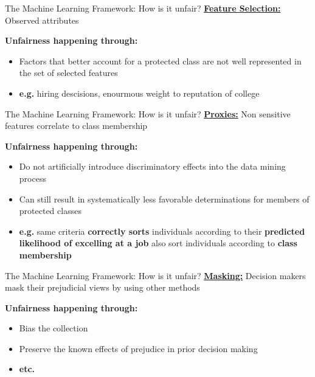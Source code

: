 \begin{frame}{The Machine Learning Framework: How is it unfair? \cite{Barocas.2016}}
    \underline{\textbf{Feature Selection:}} Observed attributes \newline 
    
    \begin{block}{\textbf{Unfairness happening through:}}
    \begin{itemize}
        \item Factors that better account for a protected class are not well represented in the set of selected features 
        \item \textbf{e.g.} hiring descisions, enourmous weight to reputation of college
    \end{itemize}
        \end{block}
\end{frame}

\begin{frame}{The Machine Learning Framework: How is it unfair? \cite{Barocas.2016}}
    \underline{\textbf{Proxies:}} Non sensitive features correlate to class membership \newline

    \begin{block}{\textbf{Unfairness happening through:}}
    \begin{itemize}
        \item Do not artificially introduce discriminatory effects into the data mining process
        \item Can still result in systematically less favorable determinations for members of protected classes
        \item \textbf{e.g.} same criteria \textbf{correctly sorts} individuals according to their \textbf{predicted likelihood of excelling at a job} also sort individuals according to \textbf{class membership}
    \end{itemize}
        \end{block}
\end{frame}

\begin{frame}{The Machine Learning Framework: How is it unfair? \cite{Barocas.2016}}
    \underline{\textbf{Masking:}} Decision makers mask their prejudicial views by using other methods \newline 
    
    \begin{block}{\textbf{Unfairness happening through:}}
    \begin{itemize}
        \item Bias the collection
        \item Preserve the known effects of prejudice in prior decision making
        \item \textbf{etc.}
    \end{itemize}
        \end{block}
\end{frame}